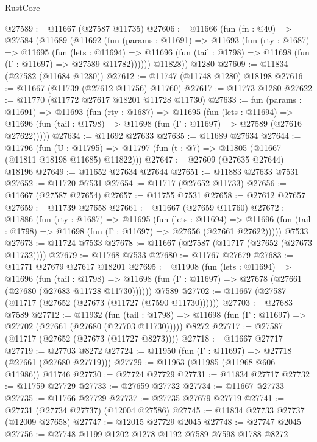 \begin{lexlean}{RustCore}
\begin{coremodule}
@27589 := @11667 (@27587 @11735)
@27606 := @11666
    (fun (fn : @40) =>
    @27584
      (@11689
        (@11692
          (fun (params : @11691) =>
          @11693
            (fun (rty : @1687) =>
            @11695
              (fun (lets : @11694) =>
              @11696 (fun (tail : @1798) => @11698 (fun (Γ : @11697) => @27589 @11782))))))
        @11828))
    @1280
@27609 := @11834 (@27582 (@11684 @1280))
@27612 := @11747 (@11748 @1280) @18198
@27616 := @11667 (@11739 (@27612 @11756) @11760)
@27617 := @11773 @1280
@27622 := @11770 (@11772 @27617 @18201 @11728 @11730)
@27633 := fun (params : @11691) =>
  @11693
    (fun (rty : @1687) =>
    @11695
      (fun (lets : @11694) =>
      @11696 (fun (tail : @1798) => @11698 (fun (Γ : @11697) => @27589 (@27616 @27622)))))
@27634 := @11692 @27633
@27635 := @11689 @27634
@27644 := @11796
    (fun (U : @11795) => @11797 (fun (t : @7) => @11805 (@11667 (@11811 @18198 @11685) @11822)))
@27647 := @27609 (@27635 @27644) @18196
@27649 := @11652 @27634 @27644
@27651 := @11883 @27633 @7531
@27652 := @11720 @7531
@27654 := @11717 (@27652 @11733)
@27656 := @11667 (@27587 @27654)
@27657 := @11755 @7531
@27658 := @27612 @27657
@27659 := @11739 @27658
@27661 := @11667 (@27659 @11760)
@27672 := @11886
    (fun (rty : @1687) =>
    @11695
      (fun (lets : @11694) =>
      @11696 (fun (tail : @1798) => @11698 (fun (Γ : @11697) => @27656 (@27661 @27622)))))
    @7533
@27673 := @11724 @7533
@27678 := @11667 (@27587 (@11717 (@27652 (@27673 @11732))))
@27679 := @11768 @7533
@27680 := @11767 @27679
@27683 := @11771 @27679 @27617 @18201
@27695 := @11908
    (fun (lets : @11694) =>
    @11696
      (fun (tail : @1798) =>
      @11698 (fun (Γ : @11697) => @27678 (@27661 (@27680 (@27683 @11728 @11730))))))
    @7589
@27702 := @11667 (@27587 (@11717 (@27652 (@27673 (@11727 (@7590 @11730))))))
@27703 := @27683 @7589
@27712 := @11932
    (fun (tail : @1798) => @11698 (fun (Γ : @11697) => @27702 (@27661 (@27680 (@27703 @11730)))))
    @8272
@27717 := @27587 (@11717 (@27652 (@27673 (@11727 @8273))))
@27718 := @11667 @27717
@27719 := @27703 @8272
@27724 := @11950 (fun (Γ : @11697) => @27718 (@27661 (@27680 @27719)))
@27729 := @11963 (@11985 (@11968 @606 @11986)) @11746
@27730 := @27724 @27729
@27731 := @11834 @27717
@27732 := @11759 @27729
@27733 := @27659 @27732
@27734 := @11667 @27733
@27735 := @11766 @27729
@27737 := @27735 @27679 @27719
@27741 := @27731 (@27734 @27737) (@12004 @27586)
@27745 := @11834 @27733 @27737 (@12009 @27658)
@27747 := @12015 @27729 @2045
@27748 := @27747 @2045
@27756 := @27748 @1199 @1202 @1278 @1192 @7589 @7598 @1788 @8272

\end{coremodule}
\end{lexlean}
